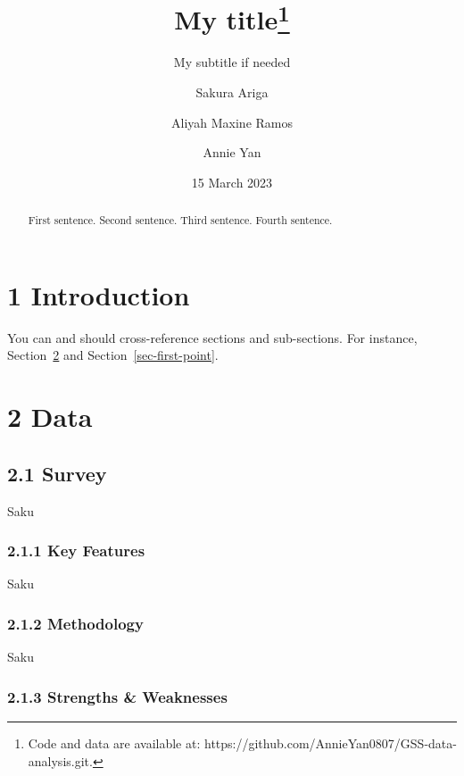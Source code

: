 \documentclass[
  letterpaper,
  DIV=11,
  numbers=noendperiod]{scrartcl}
\title{My title\thanks{Code and data are available at:
https://github.com/AnnieYan0807/GSS-data-analysis.git.}}
\subtitle{My subtitle if needed}
\author{Sakura Ariga \and Aliyah Maxine Ramos \and Annie Yan}
\date{15 March 2023}
\begin{document}
\maketitle
\begin{abstract}
First sentence. Second sentence. Third sentence. Fourth sentence.
\end{abstract}
\ifdefined\Shaded\renewenvironment{Shaded}{\begin{tcolorbox}[interior hidden, breakable, borderline west={3pt}{0pt}{shadecolor}, sharp corners, frame hidden, boxrule=0pt, enhanced]}{\end{tcolorbox}}\fi

\hypertarget{introduction}{%
\section{1 Introduction}\label{introduction}}

You can and should cross-reference sections and sub-sections. For
instance, Section~\ref{sec-data} and Section~\ref{sec-first-point}.

\hypertarget{sec-data}{%
\section{2 Data}\label{sec-data}}

\hypertarget{survey}{%
\subsection{2.1 Survey}\label{survey}}

Saku

\hypertarget{key-features}{%
\subsubsection{2.1.1 Key Features}\label{key-features}}

Saku

\hypertarget{methodology}{%
\subsubsection{2.1.2 Methodology}\label{methodology}}

Saku

\hypertarget{strengths-weaknesses}{%
\subsubsection{2.1.3 Strengths \&
Weaknesses}\label{strengths-weaknesses}}
\end{document}
